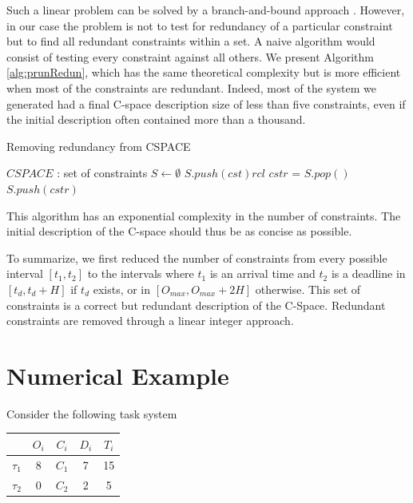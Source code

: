 \documentclass[conference]{IEEEtran}
\begin{document}
Such a linear problem can be solved by a branch-and-bound approach \cite{nemhauser1988integer}. However, in our case the problem is not to test for redundancy of a particular constraint but to find all redundant constraints within a set. A naive algorithm would consist of testing every constraint against all others. We present Algorithm \ref{alg:prunRedun}, which has the same theoretical complexity but is more efficient when most of the constraints are redundant. Indeed, most of the system we generated had a final C-space description size of less than five constraints, even if the initial description often contained more than a thousand.

\begin{algorithm}
\caption{Removing redundancy from CSPACE}
\label{alg:prunRedun}
  \begin{algorithmic}[1]
    \STATE $CSPACE$ : set of constraints
    \STATE $S \leftarrow \emptyset$
    \STATE {}
        \STATE $S.push(cst)rcl$
      \ENDIF
    \ENDFOR
    \STATE {}
      \STATE $cstr$ = $S.pop()$
        \STATE $S.push(cstr)$
      \ENDIF
    \ENDFOR
  \end{algorithmic}
\end{algorithm}

This algorithm
has an exponential complexity in the number of constraints. The initial description
of the C-space should thus be as concise as possible.

To summarize, we first reduced the number of constraints from every possible
interval $[t_1, t_2]$ to the intervals where $t_1$ is an arrival time and
$t_2$ is a deadline in $[t_d, t_d + H]$ if $t_d$ exists, or in
$[O_{max}, O_{max} + 2H]$ otherwise. This set of constraints is a
correct but redundant description of the C-Space. Redundant
constraints are removed through a linear integer approach.

\section{Numerical Example}

Consider the following task system

    \begin{center}
    \begin{tabular}{|r|c|c|c|c|}
     \hline
      & $O_i$ & $C_i$ & $D_i$ & $T_i$ \\
     \hline
     $\tau_1$ & 8 & $C_1$ & 7 & 15\\
     \hline
     $\tau_2$ & 0 & $C_2$ & 2 & 5\\
     \hline
    \end{tabular}
    \end{center}
\end{document}
